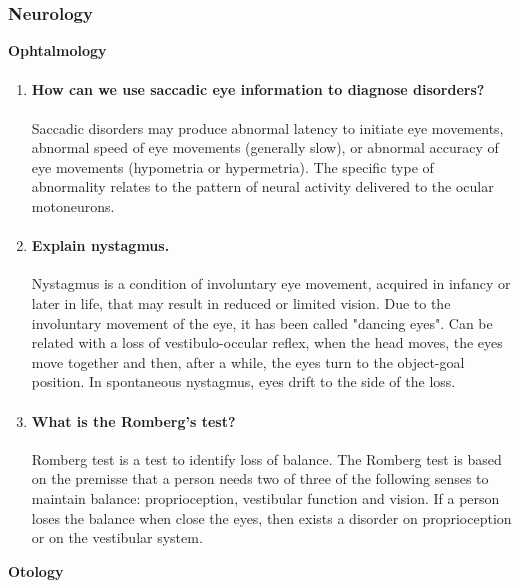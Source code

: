 \documentclass[12pt,article,oneside,a4paper]{memoir}
\begin{document}
\subsubsection{Neurology}
\textbf{Ophtalmology}\\
\begin{enumerate}
\item \paragraph{How can we use saccadic eye information to diagnose
disorders?}
Saccadic disorders may produce abnormal latency to initiate eye movements,
abnormal speed of eye movements (generally slow), or abnormal accuracy of eye
movements (hypometria or hypermetria). The specific type of abnormality relates
to the pattern of neural activity delivered to the ocular motoneurons.

\item \paragraph{Explain nystagmus.}
Nystagmus is a condition of involuntary eye movement, acquired in infancy or
later in life, that may result in reduced or limited vision. Due to the
involuntary movement of the eye, it has been called "dancing eyes". Can be
related with a loss of vestibulo-occular reflex, when the head moves, the eyes
move together and then, after a while, the eyes turn to the object-goal position.
In spontaneous nystagmus, eyes drift to the side of the loss.

\item \paragraph{What is the Romberg's test?}
Romberg test is a test to identify loss of balance. The Romberg test is based
on the premisse that a person needs two of three of the following senses to
maintain balance: proprioception, vestibular function and vision. If a person
loses the balance when close the eyes, then exists a disorder on proprioception
or on the vestibular system.

\end{enumerate}
\textbf{Otology}\\
\end{document}
